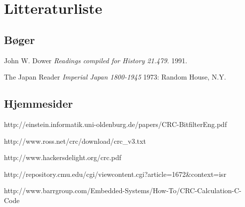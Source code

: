 \section{Litteraturliste}
\begingroup
\renewcommand{\section}[2]{}%

\begin{thebibliography}{1}
	\subsection{Bøger}
   John W. Dower {\em Readings compiled for History
  21.479.}  1991. %

    The Japan Reader {\em Imperial Japan 1800-1945} 1973:
  Random House, N.Y. %
  
	\subsection{Hjemmesider}
   {http://einstein.informatik.uni-oldenburg.de/papers/CRC-BitfilterEng.pdf}

   {http://www.ross.net/crc/download/crc\_v3.txt}
  
   {http://www.hackersdelight.org/crc.pdf}
  
  {http://repository.cmu.edu/cgi/viewcontent.cgi?article=1672\&context=isr}
  
  {http://www.barrgroup.com/Embedded-Systems/How-To/CRC-Calculation-C-Code}
  \end{thebibliography}